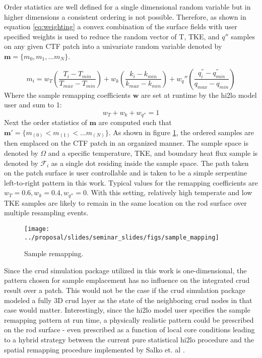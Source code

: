 Order statistics are well defined for a single dimensional random variable but in higher dimensions a consistent ordering is not possible.  Therefore, as shown in equation \ref{eq:weighting} a convex combination of the surface fields with user specified weights is used to reduce the random vector of T, TKE, and $q''$ samples on any given CTF patch into a univariate random variable denoted by $\mathbf{m}=\{m_0, m_1, ... m_N\}$.

\begin{equation}
    m_i = w_T \left( \frac{T_i - T_{min}}{T_{max} - T_{min}} \right) + w_k \left( \frac{k_i - k_{min}}{k_{max} - k_{min}} \right) +  w_q'' \left( \frac{q^{''}_i - q^{''}_{min}}{q_{max} - q_{min}} \right)
\label{eq:weighting}
\end{equation}
Where the sample remapping coefficients $\mathbf w$ are set at runtime by the hi2lo model user and sum to 1:
\begin{equation}
w_T + w_k + w_{q''} = 1
\end{equation}
Next the order statistics of $\mathbf m$ are computed such that $\mathbf m' = \{ m_{(0)} < m_{(1)}< ... m_{(N)} \}$.  As shown in figure \ref{fig:samplemapping}, the ordered samples are then emplaced on the CTF patch in an organized manner.  The sample space is denoted by $\Omega$ and a specific temperature, TKE, and boundary heat flux sample is denoted by $\mathcal F_i$ as a single dot residing inside the sample space.  The path taken on the patch surface is user controllable and is taken to be a simple serpentine left-to-right pattern in this work.
Typical values for the remapping coefficients are $w_T=0.6, w_k=0.4, w_{q''}=0$.  With this setting, relatively high temperate and low TKE samples are likely to remain in the same location on the rod surface over multiple resampling events.

\begin{figure}[H]
    \centering
    \texttt{[image: ../proposal/slides/seminar\_slides/figs/sample\_mapping]}
    \caption{Sample remapping.}
    \label{fig:samplemapping}
\end{figure}

Since the crud simulation package utilized in this work is one-dimensional, the pattern chosen for sample emplacement has no influence on the integrated crud result over a patch.  This would not be the case if the crud simulation package modeled a fully 3D crud layer as the state of the neighboring crud nodes in that case would matter.  Interestingly, since the hi2lo model user specifies the sample remapping pattern at run time, a physically realistic pattern could be prescribed on the rod surface - even prescribed as a function of local core conditions leading to a hybrid strategy between the current pure statistical hi2lo procedure and the spatial remapping procedure implemented by Salko et. al \cite{salko17}.

